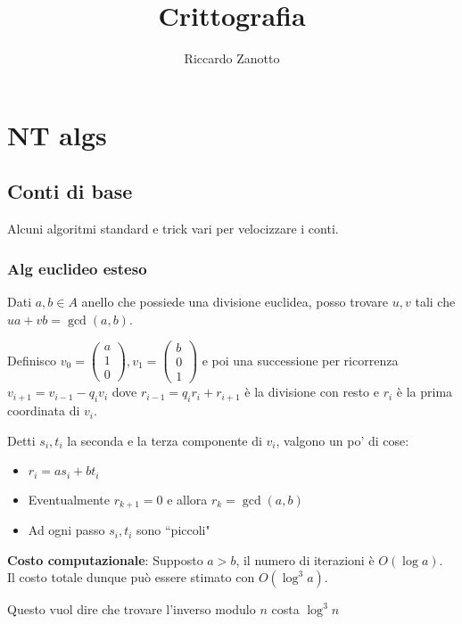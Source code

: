 \documentclass[a4paper]{book}
\author{Riccardo Zanotto}
\title{Crittografia}
\begin{document}
    \maketitle

    \tableofcontents

    \chapter{NT algs}
    \section{Conti di base}
    Alcuni algoritmi standard e trick vari per velocizzare i conti.

    \subsection{Alg euclideo esteso}
    Dati $a,b\in A$ anello che possiede una divisione euclidea, posso trovare $u,v$ tali che $ua+vb=\gcd(a,b)$.

    Definisco $v_0=\begin{pmatrix}a \\ 1 \\ 0\end{pmatrix}, v_1=\begin{pmatrix}b \\ 0 \\ 1\end{pmatrix}$ e poi una successione per ricorrenza $v_{i+1}=v_{i-1}-q_iv_i$ dove $r_{i-1}=q_ir_i+r_{i+1}$ è la divisione con resto e $r_i$ è la prima coordinata di $v_i$.

    Detti $s_i,t_i$ la seconda e la terza componente di $v_i$, valgono un po' di cose:
    \begin{itemize}
        \item $r_i=as_i+bt_i$
        \item Eventualmente $r_{k+1}=0$ e allora $r_k=\gcd(a,b)$
        \item Ad ogni passo $s_i,t_i$ sono ``piccoli"
    \end{itemize}

    \textbf{Costo computazionale}: Supposto $a>b$, il numero di iterazioni è $O(\log a)$.\\
    Il costo totale dunque può essere stimato con $O(\log^3 a)$.

    \begin{oss}
        Questo vuol dire che trovare l'inverso modulo $n$ costa $\log^3n$
    \end{oss}
\end{document}
